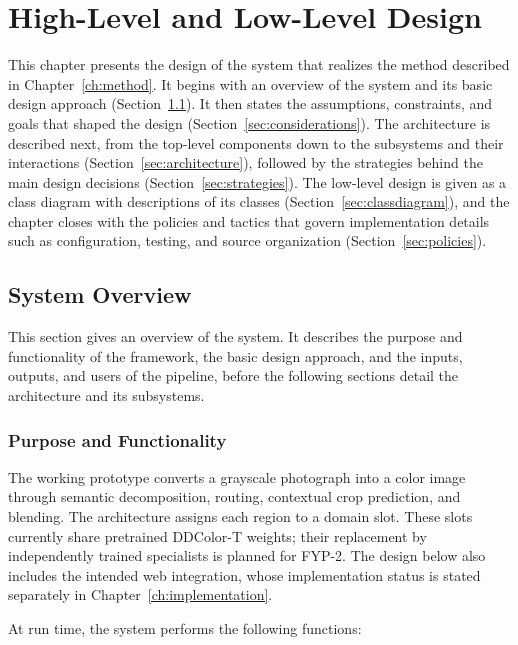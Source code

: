 \documentclass{FastFyp}
\begin{document}
\chapter{High-Level and Low-Level Design}
\label{ch:design}
This chapter presents the design of the system that realizes the method described in Chapter~\ref{ch:method}. It begins with an overview of the system and its basic design approach (Section~\ref{sec:sysoverview}). It then states the assumptions, constraints, and goals that shaped the design (Section~\ref{sec:considerations}). The architecture is described next, from the top-level components down to the subsystems and their interactions (Section~\ref{sec:architecture}), followed by the strategies behind the main design decisions (Section~\ref{sec:strategies}). The low-level design is given as a class diagram with descriptions of its classes (Section~\ref{sec:classdiagram}), and the chapter closes with the policies and tactics that govern implementation details such as configuration, testing, and source organization (Section~\ref{sec:policies}).

\section{System Overview}
\label{sec:sysoverview}

This section gives an overview of the system. It describes the purpose and functionality of the framework, the basic design approach, and the inputs, outputs, and users of the pipeline, before the following sections detail the architecture and its subsystems.

\subsection{Purpose and Functionality}

The working prototype converts a grayscale photograph into a color image through semantic decomposition, routing, contextual crop prediction, and blending. The architecture assigns each region to a domain slot. These slots currently share pretrained DDColor-T weights; their replacement by independently trained specialists is planned for FYP-2. The design below also includes the intended web integration, whose implementation status is stated separately in Chapter~\ref{ch:implementation}.

At run time, the system performs the following functions:
\end{document}
